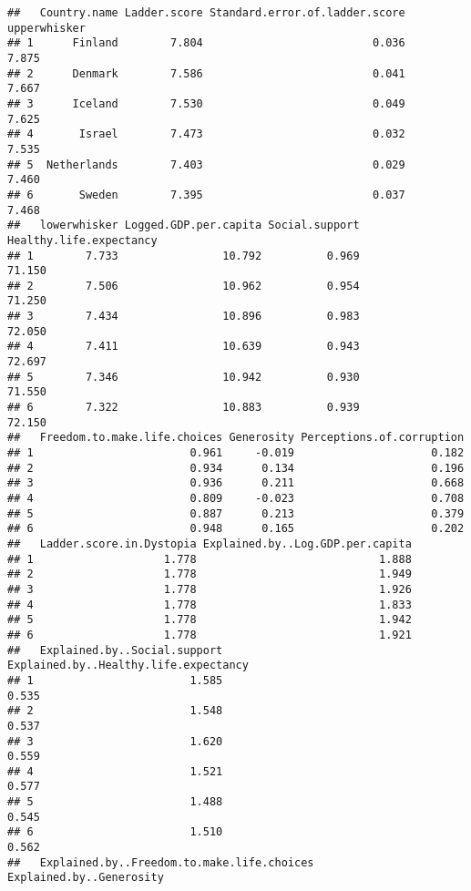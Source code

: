 \documentclass[
]{article}
\begin{document}
\begin{verbatim}
##   Country.name Ladder.score Standard.error.of.ladder.score upperwhisker
## 1      Finland        7.804                          0.036        7.875
## 2      Denmark        7.586                          0.041        7.667
## 3      Iceland        7.530                          0.049        7.625
## 4       Israel        7.473                          0.032        7.535
## 5  Netherlands        7.403                          0.029        7.460
## 6       Sweden        7.395                          0.037        7.468
##   lowerwhisker Logged.GDP.per.capita Social.support Healthy.life.expectancy
## 1        7.733                10.792          0.969                  71.150
## 2        7.506                10.962          0.954                  71.250
## 3        7.434                10.896          0.983                  72.050
## 4        7.411                10.639          0.943                  72.697
## 5        7.346                10.942          0.930                  71.550
## 6        7.322                10.883          0.939                  72.150
##   Freedom.to.make.life.choices Generosity Perceptions.of.corruption
## 1                        0.961     -0.019                     0.182
## 2                        0.934      0.134                     0.196
## 3                        0.936      0.211                     0.668
## 4                        0.809     -0.023                     0.708
## 5                        0.887      0.213                     0.379
## 6                        0.948      0.165                     0.202
##   Ladder.score.in.Dystopia Explained.by..Log.GDP.per.capita
## 1                    1.778                            1.888
## 2                    1.778                            1.949
## 3                    1.778                            1.926
## 4                    1.778                            1.833
## 5                    1.778                            1.942
## 6                    1.778                            1.921
##   Explained.by..Social.support Explained.by..Healthy.life.expectancy
## 1                        1.585                                 0.535
## 2                        1.548                                 0.537
## 3                        1.620                                 0.559
## 4                        1.521                                 0.577
## 5                        1.488                                 0.545
## 6                        1.510                                 0.562
##   Explained.by..Freedom.to.make.life.choices Explained.by..Generosity

\end{verbatim}
\end{document}
